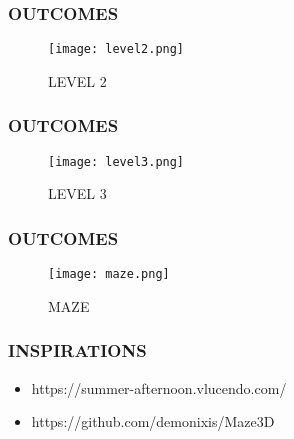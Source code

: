 \documentclass[9pt]{beamer}
\begin{document}
\begin{frame}
    \frametitle{OUTCOMES}
    \begin{figure}[h]
        \centering
        \texttt{[image: level2.png]}
        \caption{LEVEL 2}
    \end{figure}
\end{frame}

\begin{frame}
    \frametitle{OUTCOMES}
    \begin{figure}[h]
        \centering
        \texttt{[image: level3.png]}
        \caption{LEVEL 3}
    \end{figure}
\end{frame}

\begin{frame}
    \frametitle{OUTCOMES}
    \begin{figure}[h]
        \centering
        \texttt{[image: maze.png]}
        \caption{MAZE}
    \end{figure}
\end{frame}


\begin{frame}
    \frametitle{INSPIRATIONS}
    \begin{itemize}
        \item https://summer-afternoon.vlucendo.com/
        \item https://github.com/demonixis/Maze3D
    \end{itemize}
\end{frame}
\end{document}
